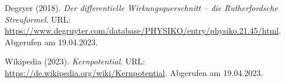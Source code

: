 \begin{thebibliography}{99}
     Degryer (2018). \emph{Der differentielle Wirkungsquerschnitt – die Rutherfordsche Streuformel}. URL: \url{https://www.degruyter.com/database/PHYSIKO/entry/physiko.21.45/html}. Abgerufen am 19.04.2023. 

     Wikipedia (2023). \emph{Kernpotential}. URL: \url{https://de.wikipedia.org/wiki/Kernpotential}. Abgerufen am 19.04.2023. 
\end{thebibliography}